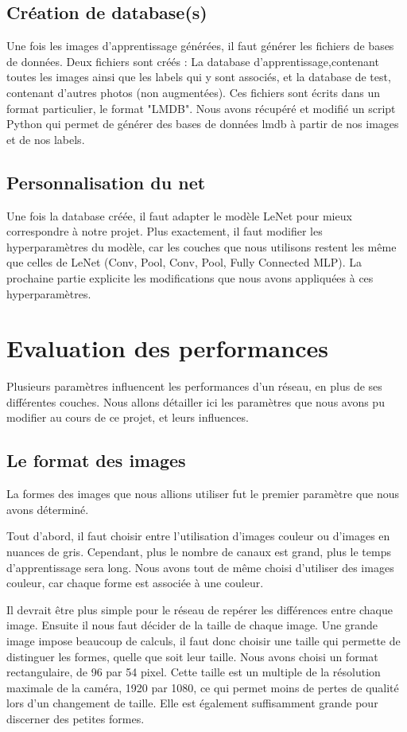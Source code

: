 \documentclass[a4paper,12pt]{article}
\begin{document}
  \subsection{Création de database(s)}
    Une fois les images d'apprentissage générées, il faut générer les fichiers de bases de données. Deux fichiers sont créés : La database d'apprentissage,contenant toutes les images ainsi que les labels qui y sont associés, et la database de test, contenant d'autres photos (non augmentées). Ces fichiers sont écrits dans un format particulier, le format "LMDB". Nous avons récupéré et modifié un script Python qui permet de générer des bases de données lmdb à partir de nos images et de nos labels.
  
  \subsection{Personnalisation du net}
    Une fois la database créée, il faut adapter le modèle LeNet pour mieux correspondre à notre projet. Plus exactement, il faut modifier les hyperparamètres du modèle, car les couches que nous utilisons restent les même que celles de LeNet (Conv, Pool, Conv, Pool, Fully Connected MLP). La prochaine partie explicite les modifications que nous avons appliquées à ces hyperparamètres.

\newpage
\section{Evaluation des performances}
  Plusieurs paramètres influencent les performances d'un réseau, en plus de ses différentes couches. Nous allons détailler ici les paramètres que nous avons pu modifier au cours de ce projet, et leurs influences.
  \subsection{Le format des images}
    La formes des images que nous allions utiliser fut le premier paramètre que nous avons déterminé. 
    
    Tout d'abord, il faut choisir entre l'utilisation d'images couleur ou d'images en nuances de gris. Cependant, plus le nombre de canaux est grand, plus le temps d'apprentissage sera long. Nous avons tout de même choisi d'utiliser des images couleur, car chaque forme est associée à une couleur. 

    Il devrait être plus simple pour le réseau de repérer les différences entre chaque image.
    Ensuite il nous faut décider de la taille de chaque image. Une grande image impose beaucoup de calculs, il faut donc choisir une taille qui permette de distinguer les formes, quelle que soit leur taille. Nous avons choisi un format rectangulaire, de 96 par 54 pixel. Cette taille est un multiple de la résolution maximale de la caméra, 1920 par 1080, ce qui permet moins de pertes de qualité lors d'un changement de taille. Elle est également suffisamment grande pour discerner des petites formes.
    
\end{document}
